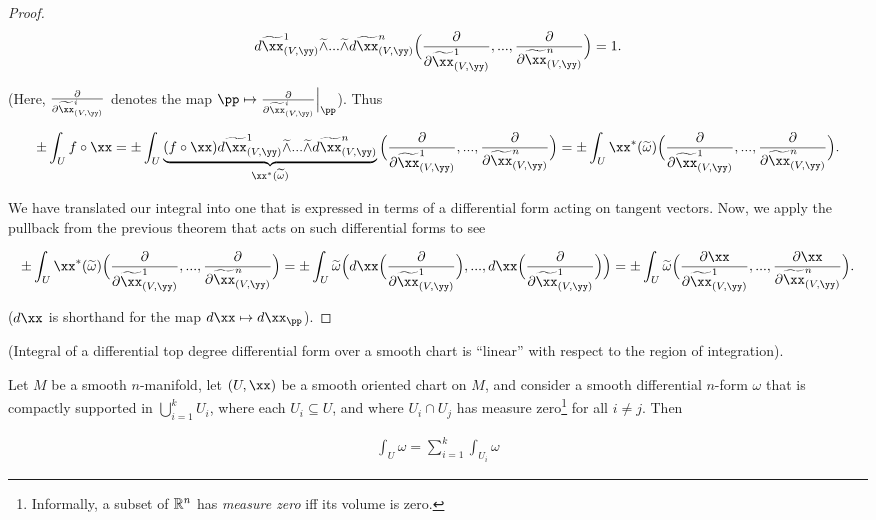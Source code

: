 \begin{proof}
    \begin{align*}
        d\tx_{(V, \yy)}^1 \twedge ... \twedge d\tx_{(V, \yy)}^n\Big( \frac{\pd}{\pd \tx_{(V, \yy)}^1}, ..., \frac{\pd}{\pd \tx_{(V, \yy)}^n}\Big) = 1.
    \end{align*}
    
    (Here, $\frac{\pd}{\pd \tx_{(V, \yy)}^i}$ denotes the map $\pp \mapsto \frac{\pd}{\pd \tx_{(V, \yy)}^i}\Big|_\pp$). Thus
    
    
    \begin{align*}
        \pm \int_U f \circ \xx = \pm \int_U \underbrace{(f \circ \xx) d\tx_{(V, \yy)}^1 \twedge ... \twedge d\tx_{(V, \yy)}^n}_{\xx^*(\tomega)} \Big( \frac{\pd}{\pd \tx_{(V, \yy)}^1}, ..., \frac{\pd}{\pd \tx_{(V, \yy)}^n}\Big) = \pm \int_U \xx^*(\tomega)\Big( \frac{\pd}{\pd \tx_{(V, \yy)}^1}, ..., \frac{\pd}{\pd \tx_{(V, \yy)}^n}\Big).
    \end{align*}
    
    We have translated our integral into one that is expressed in terms of a differential form acting on tangent vectors. Now, we apply the pullback from the previous theorem that acts on such differential forms to see
    
    \begin{align*}
        \pm \int_U \xx^*(\tomega)\Big( \frac{\pd}{\pd \tx_{(V, \yy)}^1}, ..., \frac{\pd}{\pd \tx_{(V, \yy)}^n}\Big) =
        \pm \int_U \tomega \Big( d\xx\Big( \frac{\pd}{\pd \tx_{(V, \yy)}^1} \Big), ..., d\xx\Big( \frac{\pd}{\pd \tx_{(V, \yy)}^1} \Big) \Big) = \pm \int_U \tomega \Big( \frac{\pd \xx}{\pd \tx_{(V, \yy)}^1}, ..., \frac{\pd \xx}{\pd \tx_{(V, \yy)}^n} \Big).
    \end{align*}
    
     ($d\xx$ is shorthand for the map $d\xx \mapsto d\xx_\pp$). %
\end{proof}

\begin{theorem}
\label{ch::diff_forms::thm::integral_over_smooth_chart_linear_wrt_domain}
    (Integral of a differential top degree differential form over a smooth chart is ``linear'' with respect to the region of integration).
    
    Let $M$ be a smooth $n$-manifold, let $(U, \xx)$ be a smooth oriented chart on $M$, and consider a smooth differential $n$-form $\omega$ that is compactly supported in $\bigcup_{i = 1}^k U_i$, where each $U_i \subseteq U$, and where $U_i \cap U_j$ has measure zero\footnote{Informally, a subset of $\mathbb{R}^n$ has \textit{measure zero} iff its volume is zero.} for all $i \neq j$. Then
    
    \begin{align*}
        \int_U \omega = \sum_{i = 1}^k \int_{U_i} \omega
    \end{align*}
\end{theorem}

